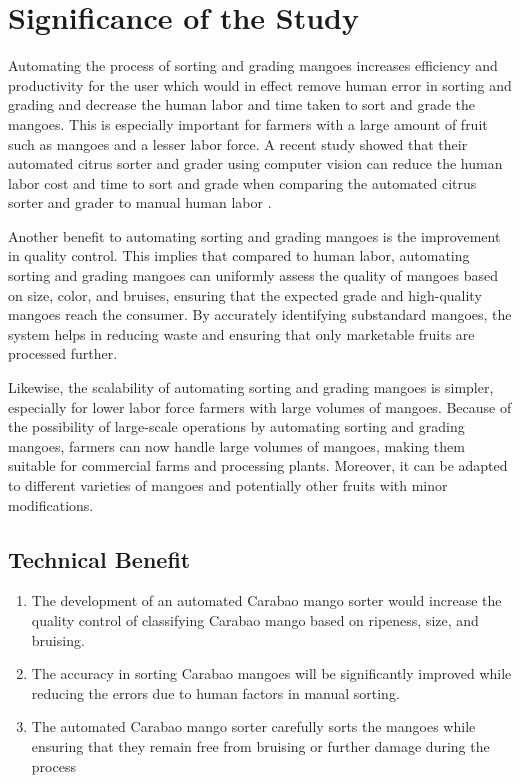 
\section{Significance of the Study}

Automating the process of sorting and grading mangoes increases efficiency and 
productivity for the user which would in effect remove human error in sorting and
grading and decrease the human labor and time taken to sort and grade the mangoes.
This is especially important for farmers with a large amount of fruit such as mangoes and a
lesser labor force. A recent study showed that
their automated citrus sorter and grader using computer vision can reduce the human
labor cost and time to sort and grade when comparing the automated citrus sorter and grader
to manual human labor \cite{chakraborty-development-2023}. 

Another benefit to automating sorting and grading mangoes is the improvement in quality control.
This implies that compared to human labor, automating sorting and grading mangoes can uniformly 
assess the quality of mangoes based on size, color, and \gls{bruises}, ensuring that the expected grade and high-quality mangoes reach the consumer. By accurately identifying substandard mangoes, the system 
helps in reducing waste and ensuring that only marketable fruits are processed further.

Likewise, the scalability of automating sorting and grading mangoes is simpler, especially 
for lower labor force farmers with large volumes of mangoes. Because of the possibility of
large-scale operations by automating sorting and grading mangoes, farmers can now handle large
volumes of mangoes, making them suitable for commercial farms and processing plants. Moreover,
it can be adapted to different varieties of mangoes and potentially other fruits with minor modifications.


\subsection{Technical Benefit}

\begin{enumerate}
	\item The development of an automated \gls{Carabao mango} sorter would increase the quality control 
	of classifying \gls{Carabao mango} based on ripeness, size, and bruising.
	
	\item The accuracy in sorting Carabao mangoes will be significantly improved while
	reducing the errors due to human factors in manual sorting.
	
	\item The automated \gls{Carabao mango}  sorter carefully sorts the mangoes 
	while ensuring that they remain free from bruising or further damage during the process	
\end{enumerate}

